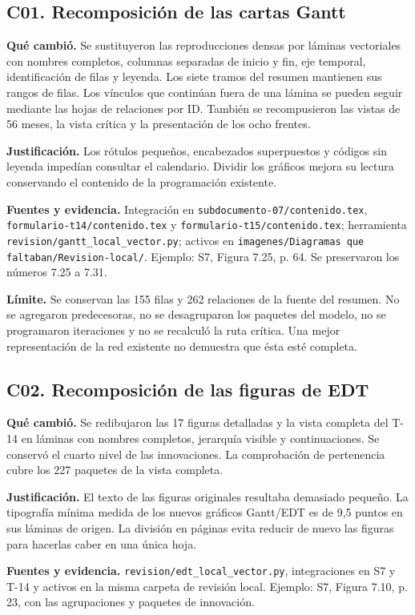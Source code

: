 \documentclass[11pt,letterpaper]{article}
\newcommand{\ruta}[1]{\nolinkurl{#1}}
\begin{document}
\subsection{C01. Recomposición de las cartas Gantt}
\textbf{Qué cambió.} Se sustituyeron las reproducciones densas por láminas
vectoriales con nombres completos, columnas separadas de inicio y fin, eje
temporal, identificación de filas y leyenda. Los siete tramos del resumen
mantienen sus rangos de filas. Los vínculos que continúan fuera de una lámina se
pueden seguir mediante las hojas de relaciones por ID. También se recompusieron
las vistas de 56 meses, la vista crítica y la presentación de los ocho frentes.

\textbf{Justificación.} Los rótulos pequeños, encabezados superpuestos y códigos
sin leyenda impedían consultar el calendario. Dividir los gráficos mejora su
lectura conservando el contenido de la programación existente.

\textbf{Fuentes y evidencia.} Integración en \ruta{subdocumento-07/contenido.tex},
\ruta{formulario-t14/contenido.tex} y \ruta{formulario-t15/contenido.tex};
herramienta \ruta{revision/gantt_local_vector.py}; activos en
\ruta{imagenes/Diagramas que faltaban/Revision-local/}.
Ejemplo: S7, Figura 7.25, p. 64. Se preservaron los números 7.25 a 7.31.

\textbf{Límite.} Se conservan las 155 filas y 262 relaciones de la fuente del
resumen. No se agregaron predecesoras, no se desagruparon los paquetes del modelo,
no se programaron iteraciones y no se recalculó la ruta crítica. Una mejor
representación de la red existente no demuestra que ésta esté completa.

\subsection{C02. Recomposición de las figuras de EDT}
\textbf{Qué cambió.} Se redibujaron las 17 figuras detalladas y la vista completa
del T-14 en láminas con nombres completos, jerarquía visible y continuaciones.
Se conservó el cuarto nivel de las innovaciones. La comprobación de pertenencia
cubre los 227 paquetes de la vista completa.

\textbf{Justificación.} El texto de las figuras originales resultaba demasiado
pequeño. La tipografía mínima medida de los nuevos gráficos Gantt/EDT es de
9,5 puntos en sus láminas de origen. La división en páginas evita reducir de
nuevo las figuras para hacerlas caber en una única hoja.

\textbf{Fuentes y evidencia.} \ruta{revision/edt_local_vector.py}, integraciones
en S7 y T-14 y activos en la misma carpeta de revisión local. Ejemplo: S7,
Figura 7.10, p. 23, con las agrupaciones y paquetes de innovación.
\end{document}
